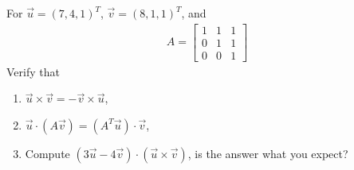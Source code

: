 \begin{Exercise}
\label{ex:ch4prob_coplanar}
For $\vec{u} = (7, 4, 1)^T$, $\vec{v} = (8, 1, 1)^T$, and
\begin{align*}
A = 
\begin{bmatrix}
1 & 1 & 1\\
0 & 1 & 1\\
0 & 0 & 1
\end{bmatrix}
\end{align*}
Verify that
\begin{enumerate}[label=(\alph*)]
\item $\vec{u} \times \vec{v} = -\vec{v} \times \vec{u}$, 
\item $\vec{u} \cdot (A\vec{v}) = (A^T\vec{u}) \cdot \vec{v}$, 
\item Compute $(3\vec{u} - 4\vec{v}) \cdot (\vec{u} \times \vec{v})$, is the answer what you expect?
\end{enumerate}
\end{Exercise}
